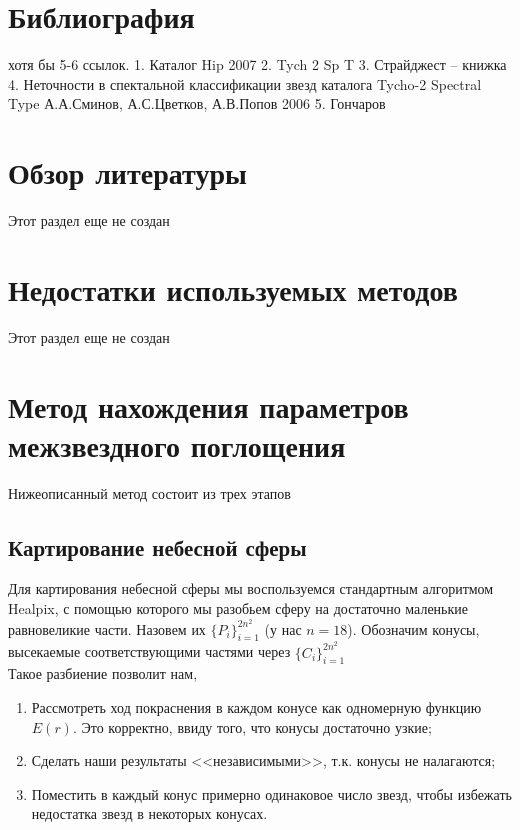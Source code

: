 \documentclass[14pt]{article}
\begin{document}
    \section{Библиография}
    хотя бы 5-6 ссылок.
1.	Каталог Hip 2007
2.	Tych 2 Sp T
3.	Страйджест – книжка
4.	Неточности в спектальной классификации звезд каталога Tycho-2 Spectral Type
А.А.Сминов, А.С.Цветков, А.В.Попов
2006
5.	Гончаров                
        
        
    \section{Обзор литературы}
        Этот раздел еще не создан
        
    \section{Недостатки используемых методов}
        Этот раздел еще не создан
        
    \section{Метод нахождения параметров межзвездного поглощения}
    
        Нижеописанный метод состоит из трех этапов
    
        \subsection{Картирование небесной сферы}
            Для картирования небесной сферы мы воспользуемся стандартным алгоритмом Healpix, с помощью которого мы разобьем сферу на достаточно маленькие равновеликие части. Назовем их $\{P_i\}_{i = 1}^{2n^2}$ (у нас $n = 18$). Обозначим конусы, высекаемые соответствующими частями через $\{C_i\}_{i = 1}^{2n^2}$\\
        
            Такое разбиение позволит нам,
            \begin{enumerate}
                \item Рассмотреть ход покраснения в каждом конусе как одномерную функцию $E(r)$. Это корректно, ввиду того, что конусы достаточно узкие;
                \item Сделать наши результаты <<независимыми>>, т.к. конусы не налагаются;
                \item Поместить в каждый конус примерно одинаковое число звезд, чтобы избежать недостатка звезд в некоторых конусах.  
            \end{enumerate}      
            
\end{document}
